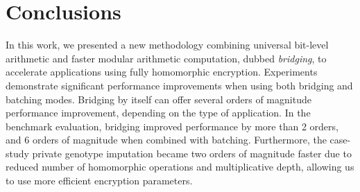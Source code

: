 \section{Conclusions}\label{s:conclusions}

In this work, we presented a new methodology combining universal bit-level arithmetic and faster modular arithmetic computation, dubbed \emph{bridging}, to accelerate applications using fully homomorphic encryption. Experiments demonstrate significant performance improvements when using both bridging and batching modes. Bridging by itself can offer several orders of magnitude performance improvement, depending on the type of application. \iffalse In the worst case, bridging offers no performance improvement, but also no performance degradation. Applications with complex operations requiring bit-level arithmetic at the beginning of execution followed by long operations on modular arithmetic are the ones that benefit the most from bridging. \fi In the benchmark evaluation, bridging improved performance by more than 2 orders, and 6 orders of magnitude when combined with batching. 
Furthermore, the case-study private genotype imputation became two orders of magnitude faster due to reduced number of homomorphic operations and multiplicative depth, allowing us to use more efficient encryption parameters.
